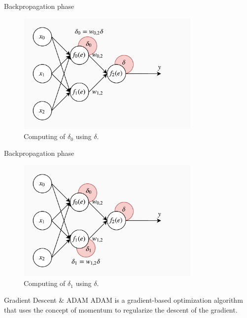\documentclass[xcolor={usenames}]{beamer}
\begin{document}
  \begin{frame}{Backpropagation phase}
  	\begin{figure}
  		\centering
  		\includegraphics[width=0.8\textwidth]{../figures/backward-propagation-1.png}
  		\caption{Computing of $\delta_0$ using $\delta$.}
  	\end{figure}
  \end{frame}
  \begin{frame}{Backpropagation phase}
  	\begin{figure}
  		\centering
  		\includegraphics[width=0.8\textwidth]{../figures/backward-propagation-2.png}
  		\caption{Computing of $\delta_1$ using $\delta$.}
  	\end{figure}
  \end{frame}
  \begin{frame}{Gradient Descent \& ADAM}
  	ADAM is a gradient-based optimization algorithm that uses the concept of momentum to regularize the descent of the gradient.
  \end{frame}
\end{document}
